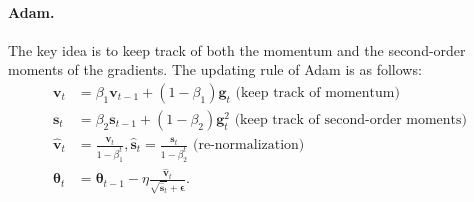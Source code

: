             \paragraph{Adam.} 
            The key idea is to keep track of both the momentum and the second-order moments of the gradients.
            The updating rule of Adam is as follows:
                \begin{equation}
                    \begin{aligned}
                        \bm{v}_t & = \beta_1 \bm{v}_{t-1} + (1 - \beta_1) \bm{g}_{t} \text{ (keep track of momentum)} \\
                        \bm{s}_t & = \beta_2 \bm{s}_{t-1} + (1-\beta_2) \bm{g}_t^2 \text{ (keep track of second-order moments)} \\
                        \hat{\bm{v}}_t & = \frac{\bm{v}_t}{1 - \beta_1^t}, \hat{\bm{s}}_t = \frac{\bm{s}_t}{1 - \beta_2^t} \text{ (re-normalization)} \\
                        \bm{\theta}_t & = \bm{\theta}_{t-1}  - \eta \frac{\hat{\bm{v}}_t}{\sqrt{\hat{\bm{s}}_t} +\bm{\epsilon}}.
                    \end{aligned}
                \end{equation}

        
    



